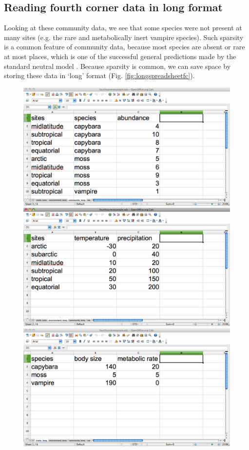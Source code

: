 \documentclass{article}
\numberwithin{exercise}{section}
\begin{document}
\subsection{Reading fourth corner data in long format}

Looking at these community data, we see that some species were not present at many sites (e.g. the rare and metabolically inert vampire species).  Such sparsity is a common feature of community data, because most species are absent or rare at most places, which is one of the successful general predictions made by the standard neutral model \citep{Hubbell2001}.  Because sparsity is common, we can save space by storing these data in `long' format (Fig. \ref{fig:longspreadsheetfc}). \begin{figure}
\includegraphics{./readingmultipletables/community_long.png}
\includegraphics{./readingmultipletables/environment_long.png}
\includegraphics{./readingmultipletables/traits_long.png}

\end{figure}
\end{document}

